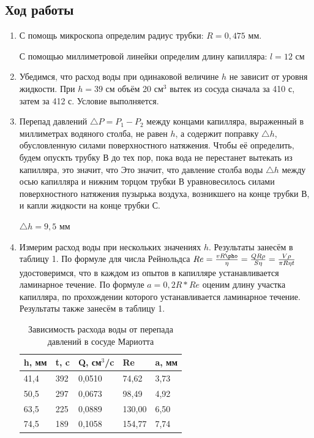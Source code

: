 \documentclass[a4paper]{article}
\begin{document}
\subsection{Ход работы}
\begin{enumerate}
    \item С помощь микроскопа определим радиус трубки: $R = 0,475$ мм. \par
    С помощью миллиметровой линейки определим длину капилляра: $l = 12$ см
    \item Убедимся, что расход воды при одинаковой величине $h$ не зависит от уровня жидкости. При $h = 39$ см объём 20 см$^3$ вытек из сосуда сначала за 410 с, затем за 412 с. Условие выполняется.
    \item Перепад давлений $\triangle P = P_1 - P_2$ между концами капилляра, выраженный в миллиметрах водяного столба, не равен $h$, а содержит поправку $\triangle h$, обусловленную силами поверхностного натяжения. Чтобы её определить, будем опускть трубку В до тех пор, пока вода не перестанет вытекать из капилляра, это значит, что Это значит, что давление столба воды $\triangle h$ между осью капилляра и нижним торцом трубки В уравновесилось силами поверхностного натяжения пузырька воздуха, возникшего на конце трубки В, и капли жидкости на конце трубки С.
    \begin{center}
    $\triangle h = 9,5$ мм
    \end{center}
    \item Измерим расход воды при нескольких значениях $h$. Результаты занесём в таблицу 1. По формуле для числа Рейнольдса $Re = \frac{vR \pho}{\eta} = \frac{QR \rho}{S \eta} = \frac{V\rho}{\pi R \eta t}$ удостоверимся, что в каждом из опытов в капилляре устанавливается ламинарное течение. По формуле $a = 0,2R * Re$ оценим длину участка капилляра, по прохождении которого устанавливается ламинарное течение. Результаты также занесём в таблицу 1.
    
    \begin{table}[h]
    \centering
    \begin{center}
    \caption{Зависимость расхода воды от перепада давлений в сосуде Мариотта}
    \end{center}
    \vspace{0.1cm}
    \label{tab:my_label}
    \begin{tabular}{ |p{1.5cm}|p{1.5cm}|p{1.5cm}|p{1.5cm}|p{1.5cm}|  }
    \hline
     h, мм & t, c & Q, см$^3$/c & Re & a, мм\\
    \hline 
     41,4 & 392 & 0,0510 & 74,62 & 3,73 \\
     50,5 & 297 & 0,0673 & 98,49 & 4,92 \\
     63,5 & 225 & 0,0889 & 130,00 & 6,50 \\
     74,5 & 189 & 0,1058 & 154,77 & 7,74 \\
    \hline
    \end{tabular}
    \end{table}
    

\end{enumerate}
\end{document}
